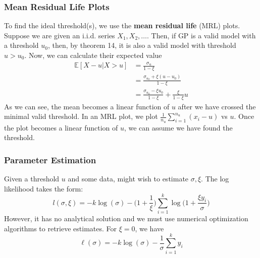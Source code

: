 \documentclass{article}
\theoremstyle{definition}
\theoremstyle{definition}
\def\E{\mathbb{E}}
\def\l{\ell}
\begin{document}
\subsubsection{Mean Residual Life Plots}
To find the ideal threshold(s), we use the \textbf{mean residual life} (MRL) plots. Suppose we are given an i.i.d. series $X_1, X_2, \hdots$. Then, if GP is a valid model with a threshold $u_0$, then, by theorem 14, it is also a valid model with threshold $u>u_0$. Now, we can calculate their expected value
\begin{align*}
    \E[X-u|X>u]&=\frac{\sigma_u}{1-\xi}\\&= \frac{\sigma_{u_0} +\xi(u-u_0)}{1-\xi}\\&= \frac{\sigma_{u_0} -\xi u_0}{1-\xi} + \frac{\xi}{1-\xi}u
\end{align*}
As we can see, the mean becomes a linear function of $u$ after we have crossed the minimal valid threshold. In an MRL plot, we plot $\frac{1}{n_u}\sum_{i=1}^{n_u}(x_i-u)$ vs $u$. Once the plot becomes a linear function of $u$, we can assume we have found the threshold. 

\subsubsection{Parameter Estimation}
Given a threshold $u$ and some data,  might wish to estimate $\sigma, \xi$. The log likelihood takes the form:
\[l(\sigma,\xi)= -k\log(\sigma) - \bigg( 1+\frac{1}{\xi}\bigg)\sum_{i=1}^k\log\bigg( 1+\frac{\xi y_i}{\sigma}\bigg)\]
However, it has no analytical solution and we must use numerical optimization algorithms to retrieve estimates. For $\xi=0$, we have 
\[\l(\sigma)= -k\log(\sigma)- \frac{1}{\sigma}\sum_{i=1}^ky_i\]
\end{document}
